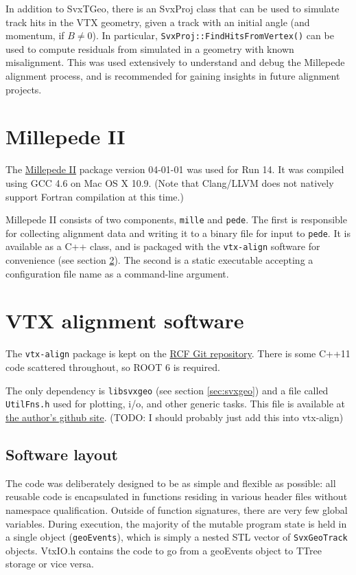 \documentclass[12pt]{article}
\begin{document}
In addition to SvxTGeo, there is an SvxProj class that can be used to simulate track hits in the VTX geometry, given a track with an initial angle (and momentum, if $B \neq 0$). In particular, \texttt{SvxProj::FindHitsFromVertex()} can be used to compute residuals from simulated in a geometry with known misalignment. This was used extensively to understand and debug the Millepede alignment process, and is recommended for gaining insights in future alignment projects.

\section{Millepede II}
The \href{http://www.desy.de/~kleinwrt/MP2/doc/html/index.html}{Millepede II} package version 04-01-01 was used for Run 14. It was compiled using GCC 4.6 on Mac OS X 10.9. (Note that Clang/LLVM does not natively support Fortran compilation at this time.)

Millepede II consists of two components, \texttt{mille} and \texttt{pede}. The first is responsible for collecting alignment data and writing it to a binary file for input to \texttt{pede}. It is available as a C++ class, and is packaged with the \texttt{vtx-align} software for convenience (see section \ref{sec:vtxalign}). The second is a static executable accepting a configuration file name as a command-line argument.

\section{VTX alignment software} \label{sec:vtxalign}
The \texttt{vtx-align} package is kept on the \href{https://git.racf.bnl.gov/phenix/cgit/vtx-align/vtx-align.git}{RCF Git repository}. There is some C++11 code scattered throughout, so ROOT 6 is required. 

The only dependency is \texttt{libsvxgeo} (see section \ref{sec:svxgeo}) and a file called \texttt{UtilFns.h} used for plotting, i/o, and other generic tasks. This file is available at \href{https://github.com/andrewadare/utils.git}{the author's github site}. (TODO: I should probably just add this into vtx-align)

\subsection{Software layout}
The code was deliberately designed to be as simple and flexible as possible: all reusable code is encapsulated in functions residing in various header files without namespace qualification. Outside of function signatures, there are very few global variables. During execution, the majority of the mutable program state is held in a single object (\texttt{geoEvents}), which is simply a nested STL vector of \texttt{SvxGeoTrack} objects. VtxIO.h contains the code to go from a geoEvents object to TTree storage or vice versa.
\end{document}
